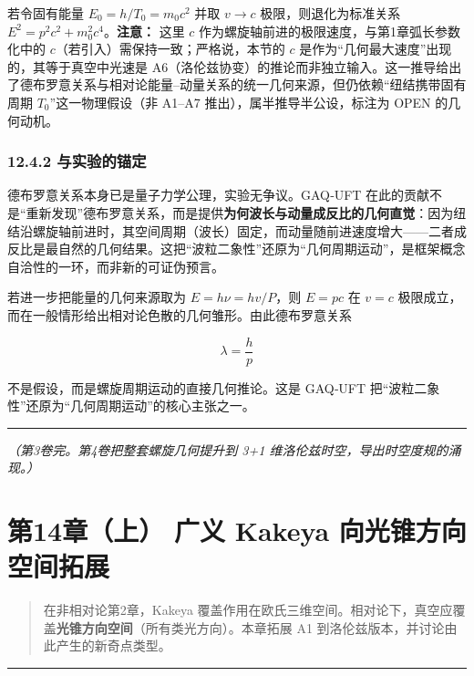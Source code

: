 若令固有能量 \(E_0=h/T_0=m_0 c^2\) 并取 \(v\to c\)
极限，则退化为标准关系 \(E^2=p^2c^2+m_0^2c^4\)。\textbf{注意：} 这里
\(c\) 作为螺旋轴前进的极限速度，与第1章弧长参数化中的
\(c\)（若引入）需保持一致；严格说，本节的 \(c\)
是作为``几何最大速度''出现的，其等于真空中光速是
A6（洛伦兹协变）的推论而非独立输入。这一推导给出了德布罗意关系与相对论能量--动量关系的统一几何来源，但仍依赖``纽结携带固有周期
\(T_0\)''这一物理假设（非 A1--A7 推出），属半推导半公设，标注为 OPEN
的几何动机。

\subsubsection{12.4.2
与实验的锚定}\label{ux4e0eux5b9eux9a8cux7684ux951aux5b9a}

德布罗意关系本身已是量子力学公理，实验无争议。GAQ‑UFT
在此的贡献不是``重新发现''德布罗意关系，而是提供\textbf{为何波长与动量成反比的几何直觉}：因为纽结沿螺旋轴前进时，其空间周期（波长）固定，而动量随前进速度增大------二者成反比是最自然的几何结果。这把``波粒二象性''还原为``几何周期运动''，是框架概念自洽性的一环，而非新的可证伪预言。

若进一步把能量的几何来源取为 \(E=h\nu=h v/P\)，则 \(E=pc\) 在 \(v=c\)
极限成立，而在一般情形给出相对论色散的几何雏形。由此德布罗意关系

\[
\boxed{\lambda=\frac{h}{p}}
\]

不是假设，而是螺旋周期运动的直接几何推论。这是 GAQ‑UFT
把``波粒二象性''还原为``几何周期运动''的核心主张之一。

\begin{center}\rule{0.5\linewidth}{0.5pt}\end{center}

\emph{（第3卷完。第4卷把整套螺旋几何提升到 3+1
维洛伦兹时空，导出时空度规的涌现。）}

\section{第14章（上） 广义 Kakeya
向光锥方向空间拓展}\label{ux7b2c14ux7ae0ux4e0a-ux5e7fux4e49-kakeya-ux5411ux5149ux9525ux65b9ux5411ux7a7aux95f4ux62d3ux5c55}

\begin{quote}
在非相对论第2章，Kakeya
覆盖作用在欧氏三维空间。相对论下，真空应覆盖\textbf{光锥方向空间}（所有类光方向）。本章拓展
A1 到洛伦兹版本，并讨论由此产生的新奇点类型。
\end{quote}

\begin{center}\rule{0.5\linewidth}{0.5pt}\end{center}

